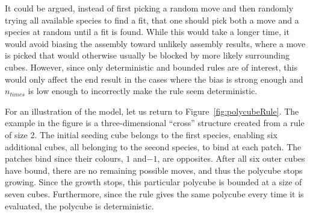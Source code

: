 It could be argued, instead of first picking a random move and then randomly trying all available species to find a fit, that one should pick both a move and a species at random until a fit is found. While this would take a longer time, it would avoid biasing the assembly toward unlikely assembly results, where a move is picked that would otherwise usually be blocked by more likely surrounding cubes. However, since only deterministic and bounded rules are of interest, this would only affect the end result in the cases where the bias is strong enough and \(n_{times}\) is low enough to incorrectly make the rule seem deterministic.


For an illustration of the model, let us return to Figure~\ref{fig:polycubeRule}. The example in the figure is a three-dimensional ``cross'' structure created from a rule of size 2. The initial seeding cube belongs to the first species, enabling six additional cubes, all belonging to the second species, to bind at each patch. The patches bind since their colours, \(1\) and\( -1\), are opposites. After all six outer cubes have bound, there are no remaining possible moves, and thus the polycube stops growing. Since the growth stops, this particular polycube is bounded at a size of seven cubes. Furthermore, since the rule gives the same polycube every time it is evaluated, the polycube is deterministic.




